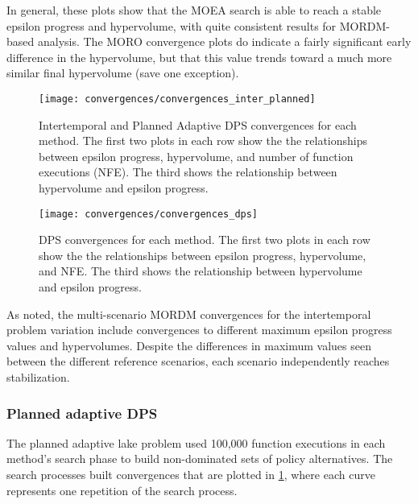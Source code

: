         In general, these plots show that the MOEA search is able to reach a stable epsilon progress and hypervolume, with quite consistent results for MORDM-based analysis. The MORO convergence plots do indicate a fairly significant early difference in the hypervolume, but that this value trends toward a much more similar final hypervolume (save one exception).

        \begin{figure}[H]
            \texttt{[image: convergences/convergences\_inter\_planned]}
            \caption[Convergences for the intertemporal and planned adaptive DPS variations]{Intertemporal and Planned Adaptive DPS convergences for each method. The first two plots in each row show the the relationships between epsilon progress, hypervolume, and number of function executions (NFE). The third shows the relationship between hypervolume and epsilon progress.}
            \label{fig:convergences-inter-planned}
        \end{figure}
        
        \begin{figure}[H]
            \texttt{[image: convergences/convergences\_dps]}
            \caption[Convergences for the DPS variation]{DPS convergences for each method. The first two plots in each row show the the relationships between epsilon progress, hypervolume, and NFE. The third shows the relationship between hypervolume and epsilon progress.}
            \label{fig:convergences-dps}
        \end{figure}

        As noted, the multi-scenario MORDM convergences for the intertemporal problem variation include convergences to different maximum epsilon progress values and hypervolumes. Despite the differences in maximum values seen between the different reference scenarios, each scenario independently reaches stabilization. 

        \subsubsection{Planned adaptive DPS}
        The planned adaptive lake problem used 100,000 function executions in each method's search phase to build non-dominated sets of policy alternatives. The search processes built convergences that are plotted in \cref{fig:convergences-inter-planned}, where each curve represents one repetition of the search process. 
        
